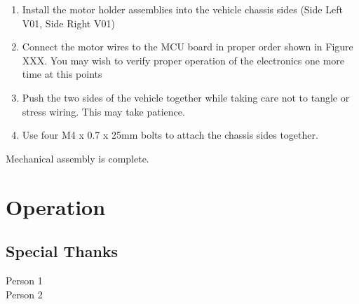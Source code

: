 \documentclass[12pt,titlepage,oneside]{memoir}
\begin{document}
\begin{enumerate}
\item Install the motor holder assemblies into the vehicle chassis sides (Side Left V01, Side Right V01)
\item Connect the motor wires to the MCU board in proper order shown in Figure XXX. You may wish to verify proper operation of the electronics one more time at this points
\item Push the two sides of the vehicle together while taking care not to tangle or stress wiring. This may take patience. 
\item Use four M4 x 0.7 x 25mm bolts to attach the chassis sides together.

\end{enumerate}

Mechanical assembly is complete.

\chapter{Operation}




\begin{appendices}
\chapter{Special Thanks}
Person 1\\
Person 2
\end{appendices}
\end{document}
